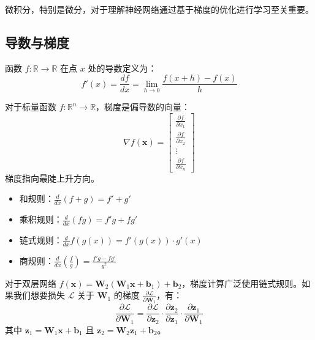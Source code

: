 微积分，特别是微分，对于理解神经网络通过基于梯度的优化进行学习至关重要。

\subsection{导数与梯度}

\begin{定义}[导数]
函数 $f: \mathbb{R} \to \mathbb{R}$ 在点 $x$ 处的导数定义为：
\begin{equation}
f'(x) = \frac{df}{dx} = \lim_{h \to 0} \frac{f(x + h) - f(x)}{h}
\end{equation}
\end{定义}

\begin{定义}[梯度]
对于标量函数 $f: \mathbb{R}^n \to \mathbb{R}$，梯度是偏导数的向量：
\begin{equation}
\nabla f(\mathbf{x}) = \begin{bmatrix}
\frac{\partial f}{\partial x_1} \\
\frac{\partial f}{\partial x_2} \\
\vdots \\
\frac{\partial f}{\partial x_n}
\end{bmatrix}
\end{equation}
梯度指向最陡上升方向。
\end{定义}

\begin{性质}[微分规则]
\begin{itemize}
    \item 和规则：$\frac{d}{dx}(f + g) = f' + g'$
    \item 乘积规则：$\frac{d}{dx}(fg) = f'g + fg'$
    \item 链式规则：$\frac{d}{dx}f(g(x)) = f'(g(x)) \cdot g'(x)$
    \item 商规则：$\frac{d}{dx}\left(\frac{f}{g}\right) = \frac{f'g - fg'}{g^2}$
\end{itemize}
\end{性质}

\begin{示例}[神经网络中的链式规则]
对于双层网络 $f(\mathbf{x}) = \mathbf{W}_2(\mathbf{W}_1\mathbf{x} + \mathbf{b}_1) + \mathbf{b}_2$，梯度计算广泛使用链式规则。如果我们想要损失 $\mathcal{L}$ 关于 $\mathbf{W}_1$ 的梯度 $\frac{\partial \mathcal{L}}{\partial \mathbf{W}_1}$，有：
\begin{equation}
\frac{\partial \mathcal{L}}{\partial \mathbf{W}_1} = \frac{\partial \mathcal{L}}{\partial \mathbf{z}_2} \cdot \frac{\partial \mathbf{z}_2}{\partial \mathbf{z}_1} \cdot \frac{\partial \mathbf{z}_1}{\partial \mathbf{W}_1}
\end{equation}
其中 $\mathbf{z}_1 = \mathbf{W}_1\mathbf{x} + \mathbf{b}_1$ 且 $\mathbf{z}_2 = \mathbf{W}_2\mathbf{z}_1 + \mathbf{b}_2$。
\end{示例}

